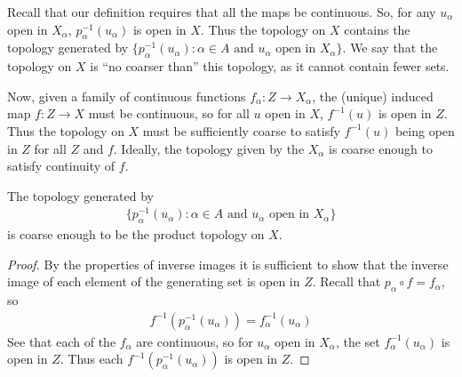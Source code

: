       Recall that our definition requires that all the maps be continuous.
      So, for any $u_\alpha$ open in $X_\alpha$, $p_\alpha^{-1}(u_\alpha)$ is open in $X$.
      Thus the topology on $X$ contains the topology generated by $\{p_\alpha^{-1}(u_\alpha):\alpha\in A\text{ and } u_\alpha\text{ open in }X_\alpha\}$.
      We say that the topology on $X$ is ``no coarser than'' this topology, as it cannot contain fewer sets.
      
      Now, given a family of continuous functions $f_\alpha:Z\rightarrow X_\alpha$, the (unique) induced map $f:Z\rightarrow X$ must be continuous, so for all $u$ open in $X$, $f^{-1}(u)$ is open in $Z$.
      Thus the topology on $X$ must be sufficiently coarse to satisfy $f^{-1}(u)$ being open in $Z$ for all $Z$ and $f$.
      Ideally, the topology given by the $X_\alpha$ is coarse enough to satisfy continuity of $f$.

      \begin{claim}
        The topology generated by 
        \begin{align*}
          \{p_\alpha^{-1}(u_\alpha):\alpha\in A\text{ and } u_\alpha\text{ open in }X_\alpha\}
        \end{align*}
        is coarse enough to be the product topology on $X$.
        \begin{proof}
          By the properties of inverse images it is sufficient to show that the inverse image of each element of the generating set is open in $Z$.
          Recall that $p_\alpha\circ f=f_\alpha$, so 
          \begin{align*}
            f^{-1}(p_\alpha^{-1}(u_\alpha)) = f_\alpha^{-1}(u_\alpha)
          \end{align*}
          See that each of the $f_\alpha$ are continuous, so for $u_\alpha$ open in $X_\alpha$, the set $f_\alpha^{-1}(u_\alpha)$ is open in $Z$.
          Thus each $f^{-1}(p_\alpha^{-1}(u_\alpha))$ is open in $Z$.
        \end{proof}
      \end{claim}

